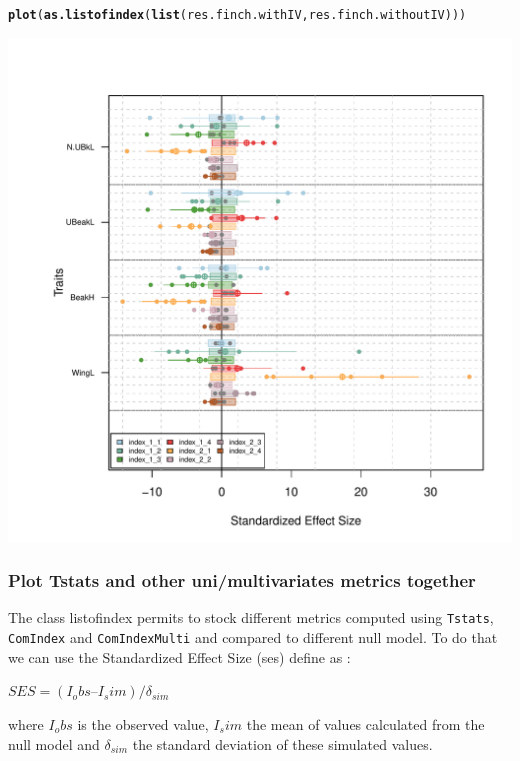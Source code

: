 \documentclass[12pt]{article}\usepackage[]{graphicx}\usepackage[]{color}
\makeatletter
\def\maxwidth{ %
  \ifdim\Gin@nat@width>\linewidth
    \linewidth
  \else
    \Gin@nat@width
  \fi
}
\newcommand{\hlstd}[1]{\textcolor[rgb]{0.345,0.345,0.345}{#1}}%
\newcommand{\hlkwd}[1]{\textcolor[rgb]{0.737,0.353,0.396}{\textbf{#1}}}%
\newenvironment{kframe}{%
 \def\at@end@of@kframe{}%
 \ifinner\ifhmode%
  \def\at@end@of@kframe{\end{minipage}}%
  \begin{minipage}{\columnwidth}%
 \fi\fi%
 \def\FrameCommand##1{\hskip\@totalleftmargin \hskip-\fboxsep
 \colorbox{shadecolor}{##1}\hskip-\fboxsep
     \hskip-\linewidth \hskip-\@totalleftmargin \hskip\columnwidth}%
 \MakeFramed {\advance\hsize-\width
   \@totalleftmargin\z@ \linewidth\hsize
   \@setminipage}}%
 {\par\unskip\endMakeFramed%
 \at@end@of@kframe}
\newenvironment{knitrout}{}{} %
\makeatother
\begin{document}
\begin{knitrout}
\color{fgcolor}\begin{kframe}
\begin{alltt}
\hlkwd{plot}\hlstd{(}\hlkwd{as.listofindex}\hlstd{(}\hlkwd{list}\hlstd{(res.finch.withIV, res.finch.withoutIV)))}
\end{alltt}
\end{kframe}
\includegraphics[width=\maxwidth]{figure/unnamed-chunk-48-1} 

\end{knitrout}

\subsubsection{Plot Tstats and other uni/multivariates metrics together}
The class listofindex permits to stock different metrics computed using \texttt{Tstats}, \texttt{ComIndex} and \texttt{ComIndexMulti} and compared to different null model. To do that we can use the Standardized Effect Size (ses) define as : 

\begin{center}
$SES = (I_obs – I_sim) / \delta_{sim}$
\end{center}

where $I_obs$ is the observed value, $I_sim$ the mean of values calculated from the null model and $\delta_{sim}$ the standard deviation of these simulated values.
\end{document}
